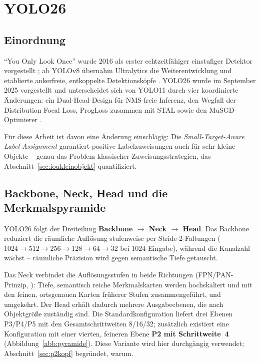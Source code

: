 \section{YOLO26}
\label{sec:yolo26}

\subsection{Einordnung}

\enquote{You Only Look Once} wurde 2016 als erster echtzeitfähiger einstufiger
Detektor vorgestellt \parencite{redmon2016}; ab YOLOv8 übernahm Ultralytics die
Weiterentwicklung und etablierte ankerfreie, entkoppelte Detektionsköpfe
\parencite{sapkota2025}. YOLO26 wurde im September 2025 vorgestellt und
unterscheidet sich von YOLO11 durch vier koordinierte Änderungen: ein
Dual-Head-Design für NMS-freie Inferenz, den Wegfall der Distribution Focal Loss,
ProgLoss zusammen mit STAL sowie den MuSGD-Optimierer
\parencite{jocher2026yolo26,sapkota2025}.

Für diese Arbeit ist davon eine Änderung einschlägig: Die
\emph{Small-Target-Aware Label Assignment} garantiert positive Labelzuweisungen
auch für sehr kleine Objekte -- genau das Problem klassischer
Zuweisungsstrategien, das Abschnitt~\ref{sec:ioukleinobjekt} quantifiziert.

\subsection{Backbone, Neck, Head und die Merkmalspyramide}
\label{sec:neck}

YOLO26 folgt der Dreiteilung \textbf{Backbone $\to$ Neck $\to$ Head}. Das
Backbone reduziert die räumliche Auflösung stufenweise per Stride-2-Faltungen
($1024 \to 512 \to 256 \to 128 \to 64 \to 32$ bei $1024$\px{} Eingabe), während
die Kanalzahl wächst -- räumliche Präzision wird gegen semantische Tiefe
getauscht.

 Das Neck verbindet die Auflösungsstufen in beide Richtungen
(FPN/PAN-Prinzip, \cite{lin2017fpn}): Tiefe, semantisch reiche Merkmalskarten
werden hochskaliert und mit den feinen, ortsgenauen Karten früherer Stufen
zusammengeführt, und umgekehrt. Der Head erhält dadurch mehrere Ausgabeebenen,
die nach Objektgröße zuständig sind. Die Standardkonfiguration liefert drei
Ebenen P3/P4/P5 mit den Gesamtschrittweiten 8/16/32; zusätzlich existiert eine
Konfiguration mit einer vierten, feineren Ebene \textbf{P2 mit Schrittweite~4}
(Abbildung~\ref{abb:pyramide}). Diese Variante wird hier durchgängig verwendet;
Abschnitt~\ref{sec:p2kopf} begründet, warum.

